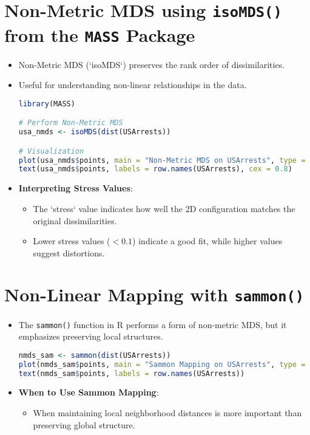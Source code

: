 \documentclass{article}
\begin{document}
\section{Non-Metric MDS using \texttt{isoMDS()} from the \texttt{MASS} Package}
\begin{itemize}
    \item Non-Metric MDS (`isoMDS`) preserves the rank order of dissimilarities.
    \item Useful for understanding non-linear relationships in the data.
\begin{lstlisting}[language=R, breaklines=true]
library(MASS)

# Perform Non-Metric MDS
usa_nmds <- isoMDS(dist(USArrests))

# Visualization
plot(usa_nmds$points, main = "Non-Metric MDS on USArrests", type = "n")
text(usa_nmds$points, labels = row.names(USArrests), cex = 0.8)
\end{lstlisting}
\item \textbf{Interpreting Stress Values}:
    \begin{itemize}
        \item The `stress` value indicates how well the 2D configuration matches the original dissimilarities.
        \item Lower stress values (\(< 0.1\)) indicate a good fit, while higher values suggest distortions.
    \end{itemize}
\end{itemize}

\section{Non-Linear Mapping with \texttt{sammon()}}
\begin{itemize}
    \item The \texttt{sammon()} function in R performs a form of non-metric MDS, but it emphasizes preserving local structures.
\begin{lstlisting}[language=R, breaklines=true]
nmds_sam <- sammon(dist(USArrests))
plot(nmds_sam$points, main = "Sammon Mapping on USArrests", type = "n")
text(nmds_sam$points, labels = row.names(USArrests))
\end{lstlisting}
\item \textbf{When to Use Sammon Mapping}:
    \begin{itemize}
        \item When maintaining local neighborhood distances is more important than preserving global structure.
    \end{itemize}
\end{itemize}
\end{document}
